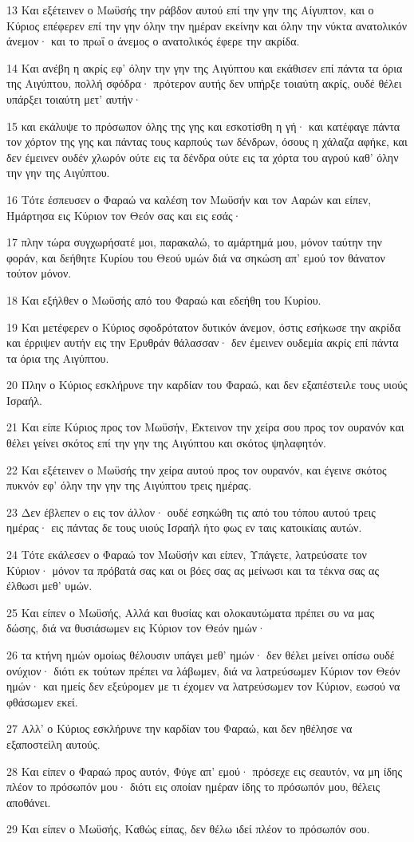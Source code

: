 \par 13 Και εξέτεινεν ο Μωϋσής την ράβδον αυτού επί την γην της Αίγυπτον, και ο Κύριος επέφερεν επί την γην όλην την ημέραν εκείνην και όλην την νύκτα ανατολικόν άνεμον· και το πρωΐ ο άνεμος ο ανατολικός έφερε την ακρίδα.
\par 14 Και ανέβη η ακρίς εφ' όλην την γην της Αιγύπτου και εκάθισεν επί πάντα τα όρια της Αιγύπτου, πολλή σφόδρα· πρότερον αυτής δεν υπήρξε τοιαύτη ακρίς, ουδέ θέλει υπάρξει τοιαύτη μετ' αυτήν·
\par 15 και εκάλυψε το πρόσωπον όλης της γης και εσκοτίσθη η γή· και κατέφαγε πάντα τον χόρτον της γης και πάντας τους καρπούς των δένδρων, όσους η χάλαζα αφήκε, και δεν έμεινεν ουδέν χλωρόν ούτε εις τα δένδρα ούτε εις τα χόρτα του αγρού καθ' όλην την γην της Αιγύπτου.
\par 16 Τότε έσπευσεν ο Φαραώ να καλέση τον Μωϋσήν και τον Ααρών και είπεν, Ημάρτησα εις Κύριον τον Θεόν σας και εις εσάς·
\par 17 πλην τώρα συγχωρήσατέ μοι, παρακαλώ, το αμάρτημά μου, μόνον ταύτην την φοράν, και δεήθητε Κυρίου του Θεού υμών διά να σηκώση απ' εμού τον θάνατον τούτον μόνον.
\par 18 Και εξήλθεν ο Μωϋσής από του Φαραώ και εδεήθη του Κυρίου.
\par 19 Και μετέφερεν ο Κύριος σφοδρότατον δυτικόν άνεμον, όστις εσήκωσε την ακρίδα και έρριψεν αυτήν εις την Ερυθράν θάλασσαν· δεν έμεινεν ουδεμία ακρίς επί πάντα τα όρια της Αιγύπτου.
\par 20 Πλην ο Κύριος εσκλήρυνε την καρδίαν του Φαραώ, και δεν εξαπέστειλε τους υιούς Ισραήλ.
\par 21 Και είπε Κύριος προς τον Μωϋσήν, Έκτεινον την χείρα σου προς τον ουρανόν και θέλει γείνει σκότος επί την γην της Αιγύπτου και σκότος ψηλαφητόν.
\par 22 Και εξέτεινεν ο Μωϋσής την χείρα αυτού προς τον ουρανόν, και έγεινε σκότος πυκνόν εφ' όλην την γην της Αιγύπτου τρεις ημέρας.
\par 23 Δεν έβλεπεν ο εις τον άλλον· ουδέ εσηκώθη τις από του τόπου αυτού τρεις ημέρας· εις πάντας δε τους υιούς Ισραήλ ήτο φως εν ταις κατοικίαις αυτών.
\par 24 Τότε εκάλεσεν ο Φαραώ τον Μωϋσήν και είπεν, Υπάγετε, λατρεύσατε τον Κύριον· μόνον τα πρόβατά σας και οι βόες σας ας μείνωσι και τα τέκνα σας ας έλθωσι μεθ' υμών.
\par 25 Και είπεν ο Μωϋσής, Αλλά και θυσίας και ολοκαυτώματα πρέπει συ να μας δώσης, διά να θυσιάσωμεν εις Κύριον τον Θεόν ημών·
\par 26 τα κτήνη ημών ομοίως θέλουσιν υπάγει μεθ' ημών· δεν θέλει μείνει οπίσω ουδέ ονύχιον· διότι εκ τούτων πρέπει να λάβωμεν, διά να λατρεύσωμεν Κύριον τον Θεόν ημών· και ημείς δεν εξεύρομεν με τι έχομεν να λατρεύσωμεν τον Κύριον, εωσού να φθάσωμεν εκεί.
\par 27 Αλλ' ο Κύριος εσκλήρυνε την καρδίαν του Φαραώ, και δεν ηθέλησε να εξαποστείλη αυτούς.
\par 28 Και είπεν ο Φαραώ προς αυτόν, Φύγε απ' εμού· πρόσεχε εις σεαυτόν, να μη ίδης πλέον το πρόσωπόν μου· διότι εις οποίαν ημέραν ίδης το πρόσωπόν μου, θέλεις αποθάνει.
\par 29 Και είπεν ο Μωϋσής, Καθώς είπας, δεν θέλω ιδεί πλέον το πρόσωπόν σου.

